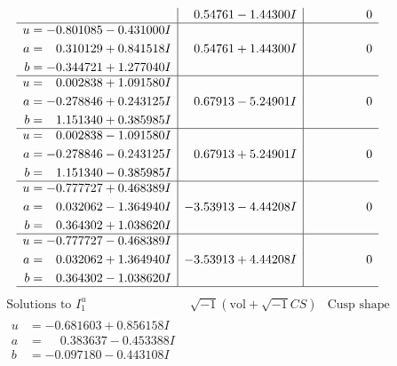 \documentclass[1p]{elsarticle_modified}
\theoremstyle{definition}
\newcommand{\I}{\sqrt{-1}}
\begin{document}
$$\begin{array}{c|c|c}
 & \phantom{-}0.54761 - 1.44300 I & \phantom{-0.000000 } 0 \\ \hline\begin{aligned}
u &= -0.801085 - 0.431000 I \\
a &= \phantom{-}0.310129 + 0.841518 I \\
b &= -0.344721 + 1.277040 I\end{aligned}
 & \phantom{-}0.54761 + 1.44300 I & \phantom{-0.000000 } 0 \\ \hline\begin{aligned}
u &= \phantom{-}0.002838 + 1.091580 I \\
a &= -0.278846 + 0.243125 I \\
b &= \phantom{-}1.151340 + 0.385985 I\end{aligned}
 & \phantom{-}0.67913 - 5.24901 I & \phantom{-0.000000 } 0 \\ \hline\begin{aligned}
u &= \phantom{-}0.002838 - 1.091580 I \\
a &= -0.278846 - 0.243125 I \\
b &= \phantom{-}1.151340 - 0.385985 I\end{aligned}
 & \phantom{-}0.67913 + 5.24901 I & \phantom{-0.000000 } 0 \\ \hline\begin{aligned}
u &= -0.777727 + 0.468389 I \\
a &= \phantom{-}0.032062 - 1.364940 I \\
b &= \phantom{-}0.364302 + 1.038620 I\end{aligned}
 & -3.53913 - 4.44208 I & \phantom{-0.000000 } 0 \\ \hline\begin{aligned}
u &= -0.777727 - 0.468389 I \\
a &= \phantom{-}0.032062 + 1.364940 I \\
b &= \phantom{-}0.364302 - 1.038620 I\end{aligned}
 & -3.53913 + 4.44208 I & \phantom{-0.000000 } 0\\
 \hline 
 \end{array}$$\newpage$$\begin{array}{c|c|c}  
\text{Solutions to }I^u_{1}& \I (\text{vol} + \sqrt{-1}CS) & \text{Cusp shape}\\
 \hline 
\begin{aligned}
u &= -0.681603 + 0.856158 I \\
a &= \phantom{-}0.383637 - 0.453388 I \\
b &= -0.097180 - 0.443108 I\end{aligned}

\end{array}$$
\end{document}
